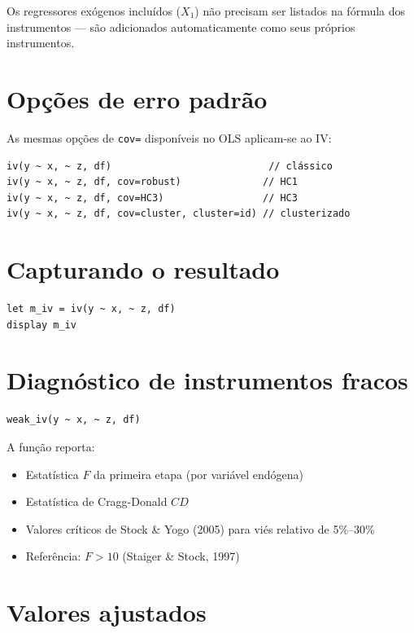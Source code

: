 \begin{nota}
  Os regressores exógenos incluídos ($X_1$) não precisam ser listados na
  fórmula dos instrumentos — são adicionados automaticamente como seus
  próprios instrumentos.
\end{nota}

\section{Opções de erro padrão}

As mesmas opções de \lstinline{cov=} disponíveis no OLS aplicam-se ao IV:

\begin{lstlisting}
iv(y ~ x, ~ z, df)                           // clássico
iv(y ~ x, ~ z, df, cov=robust)              // HC1
iv(y ~ x, ~ z, df, cov=HC3)                 // HC3
iv(y ~ x, ~ z, df, cov=cluster, cluster=id) // clusterizado
\end{lstlisting}

\section{Capturando o resultado}

\begin{lstlisting}
let m_iv = iv(y ~ x, ~ z, df)
display m_iv
\end{lstlisting}

\section{Diagnóstico de instrumentos fracos}

\begin{lstlisting}[caption={Teste de instrumentos fracos}]
weak_iv(y ~ x, ~ z, df)
\end{lstlisting}

A função reporta:
\begin{itemize}
  \item Estatística $F$ da primeira etapa (por variável endógena)
  \item Estatística de Cragg-Donald $CD$
  \item Valores críticos de Stock \& Yogo (2005) para viés relativo de 5\%–30\%
  \item Referência: $F > 10$ (Staiger \& Stock, 1997)
\end{itemize}

\section{Valores ajustados}

